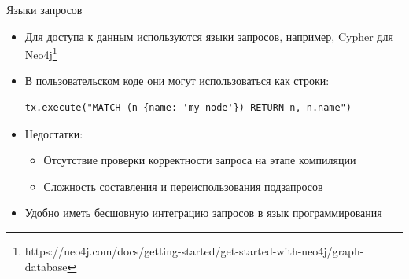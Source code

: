 \documentclass[aspectratio=169]{beamer}
\begin{document}
\begin{frame}[fragile]{Языки запросов}
  \begin{itemize}
    \item Для доступа к данным используются языки запросов, например, Cypher для Neo4j\footnote{https://neo4j.com/docs/getting-started/get-started-with-neo4j/graph-database}
    \item В пользовательском коде они могут использоваться как строки:
          \begin{verbatim}
tx.execute("MATCH (n {name: 'my node'}) RETURN n, n.name")
\end{verbatim}
    \item Недостатки:
          \begin{itemize}
            \item Отсутствие проверки корректности запроса на этапе компиляции
            \item Сложность составления и переиспользования подзапросов
          \end{itemize}
    \item Удобно иметь бесшовную интеграцию запросов в язык программирования
  \end{itemize}

\end{frame}


\end{document}
